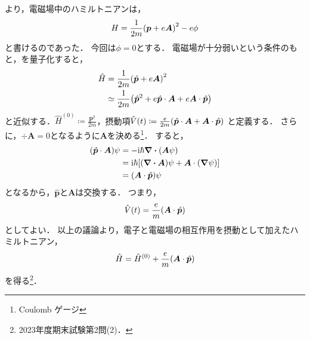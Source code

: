 \documentclass{report}
\begin{document}
  より，電磁場中のハミルトニアンは，
  \begin{align}
    H = \frac{1}{2m}\qty(\bm{p} + e\bm{A})^2 - e\phi\label{hamiltonian-in-electro-magnetic-field-cm-re}
  \end{align}
  と書けるのであった．
  今回は$\phi = 0$とする．
  電磁場が十分弱いという条件のもと，を量子化すると，
  \begin{align}
    \hat{H} &= \frac{1}{2m}\qty(\hat{\bm{p}} + e\bm{A})^2 \\
    &\simeq \frac{1}{2m}\qty(\hat{\bm{p}}^2 + e\hat{\bm{p}}\cdot\bm{A} + e\bm{A} \cdot \hat{\bm{p}})\\
  \end{align}
  と近似する．$\hat{H}^{(0)} \coloneqq \frac{\bm{p}^2}{2m}$，摂動項$\hat{V}(t) \coloneqq \frac{e}{2m} \qty(\hat{\bm{p}}\cdot\bm{A} + \bm{A} \cdot \hat{\bm{p}})$
  と定義する．
  さらに，$\div\bm{A} = 0$となるように$\bm{A}$を決める\footnote{Coulomb ゲージ}．
  すると，
  \begin{align}
    \qty(\hat{\bm{p}} \cdot \bm{A})\psi &= -\mathrm{i}\hbar \div\qty(\bm{A} \psi)\\
    &= \mathrm{i}\hbar\qty[\qty(\div\bm{A}) \psi + \bm{A} \cdot \qty(\grad \psi)]\\
    &= \qty(\bm{A} \cdot \hat{\bm{p}}) \psi
  \end{align}
  となるから，$\hat{\bm{p}}$と$\bm{A}$は交換する．
  つまり，
  \begin{align}
    \hat{V}(t) = \frac{e}{m}\qty(\bm{A}\cdot\hat{\bm{p}})
  \end{align}
  としてよい．
  以上の議論より，電子と電磁場の相互作用を摂動として加えたハミルトニアン，
  \begin{align}
    \hat{H} = \hat{H}^{(0)} + \frac{e}{m}\qty(\bm{A} \cdot \hat{\bm{p}})
  \end{align}
  を得る\footnote{2023年度期末試験第2問(2)．}．
\end{document}
